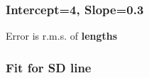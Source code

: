 \documentclass[handout]{beamer}
\begin{document}


   \begin{frame}
   \frametitle{Intercept=4, Slope=0.3}
   \begin{center}
   \end{center}
   Error is r.m.s. of {\bf \color{red} lengths}
   \end{frame}



   \begin{frame}
   \frametitle{Fit for SD line}
   \begin{center}
   \end{center}

   \end{frame}
\end{document}

